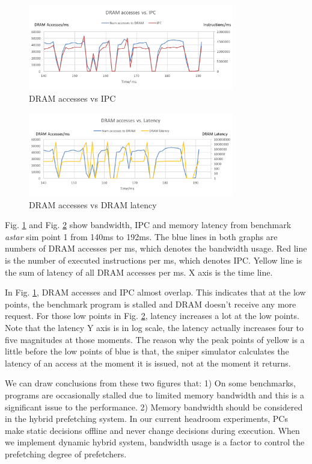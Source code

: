     \begin{figure}[h]
	    \centering
	    \includegraphics[width=0.8\textwidth]{images/bandwidth_IPC.png}
	    \caption{DRAM accesses vs IPC}
	    \label{fig:bandwidth_IPC}
    \end{figure}
    \begin{figure}[h]
	    \centering
	    \includegraphics[width=0.8\textwidth]{images/bandwidth_latency.png}
	    \caption{DRAM accesses vs DRAM latency}
	   \label{fig:bandwidth_latency}
    \end{figure}

Fig. \ref{fig:bandwidth_IPC} and Fig. \ref{fig:bandwidth_latency} show bandwidth, IPC and memory latency from benchmark \emph{astar} sim point 1 from 140ms to 192ms. The blue lines in both graphs are numbers of DRAM accesses per ms, which denotes the bandwidth usage. Red line is the number of executed instructions per ms, which denotes IPC. Yellow line is the sum of latency of all DRAM accesses per ms. X axis is the time line.\par
In Fig. \ref{fig:bandwidth_IPC}, DRAM accesses and IPC almost overlap. This indicates that at the low points, the benchmark program is stalled and DRAM doesn't receive any more request. For those low points in Fig. \ref{fig:bandwidth_latency}, latency increases a lot at the low points. Note that the latency Y axis is in log scale, the latency actually increases four to five magnitudes at those moments. The reason why the peak points of yellow is a little before the low points of blue is that, the sniper simulator calculates the latency of an access at the moment it is issued, not at the moment it returns.\par
 We can draw conclusions from these two figures that: 1) On some benchmarks, programs are occasionally stalled due to limited memory bandwidth and this is a significant issue to the performance. 2) Memory bandwidth should be considered in the hybrid prefetching system.  In our current headroom experiments, PCs make static decisions offline and never change decisions during execution. When we implement dynamic hybrid system, bandwidth usage is a factor to control the prefetching degree of prefetchers. \par


